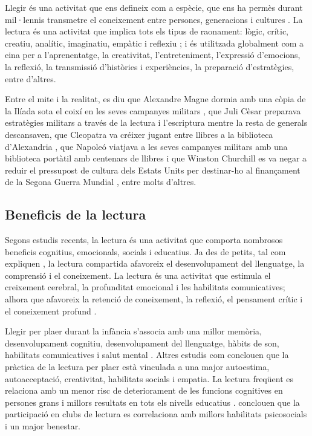 \documentclass[12pt]{article}
\begin{document}
Llegir és una activitat que ens defineix com a espècie, que ens ha permès durant mil·lennis transmetre el coneixement entre persones, generacions i cultures \parencite{shutaleva}. La lectura és una activitat que implica tots els tipus de raonament: lògic, crític, creatiu, analític, imaginatiu, empàtic i reflexiu \parencite{chiweta_sm}; i és utilitzada globalment com a eina per a l'aprenentatge, la creativitat, l'entreteniment, l'expressió d'emocions, la reflexió, la transmissió d'històries i experiències, la preparació d'estratègies, entre d'altres.

Entre el mite i la realitat, es diu que Alexandre Magne dormia amb una còpia de la Ilíada sota el coixí en les seves campanyes militars \parencite{plutarc}, que Juli Cèsar preparava estratègies militars a través de la lectura i l'escriptura mentre la resta de generals descansaven, que Cleopatra va créixer jugant entre llibres a la biblioteca d'Alexandria \parencite{posteguillo_maldita}, que Napoleó viatjava a les seves campanyes militars amb una biblioteca portàtil amb centenars de llibres i que Winston Churchill es va negar a reduir el pressupost de cultura dels Estats Units per destinar-ho al finançament de la Segona Guerra Mundial \parencite{posteguillo_tertulia}, entre molts d'altres.

\subsection{Beneficis de la lectura}

Segons estudis recents, la lectura és una activitat que comporta nombrosos beneficis cognitius, emocionals, socials i educatius. Ja des de petits, tal com expliquen \textcite{goikoetxea_lectura}, la lectura compartida afavoreix el desenvolupament del llenguatge, la comprensió i el coneixement. La lectura és una activitat que estimula el creixement cerebral, la profunditat emocional i les habilitats comunicatives; alhora que afavoreix la retenció de coneixement, la reflexió, el pensament crític i el coneixement profund \parencite{ataniyazova}. 

Llegir per plaer durant la infància s'associa amb una millor memòria, desenvolupament cognitiu, desenvolupament del llenguatge, hàbits de son, habilitats comunicatives i salut mental \parencite{sun_childhood}. Altres estudis com \textcite{billington_reading} conclouen que la pràctica de la lectura per plaer està vinculada a una major autoestima, autoacceptació, creativitat, habilitats socials i empatia. La lectura freqüent es relaciona amb un menor risc de deteriorament de les funcions cognitives en persones grans i millors resultats en tots els nivells educatius \parencite{chang_reading}. \textcite{banas_biblio} conclouen que la participació en clubs de lectura es correlaciona amb millors habilitats psicosocials i un major benestar.
\end{document}
